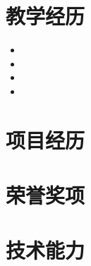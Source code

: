 \documentclass[zh]{resume}
\begin{document}
\section{教学经历}

\begin{itemize}[nosep]
  \item  %
  \item  %
  \item  %
  \item  %
\end{itemize}


\section{项目经历}






\section{荣誉奖项}

\begin{enumerate}[label={[\arabic*]},nosep]
  \item  %
  \item  %
  \item  %
  \item  %
  \item  %
\end{enumerate}


\section{技术能力}


\end{document}
